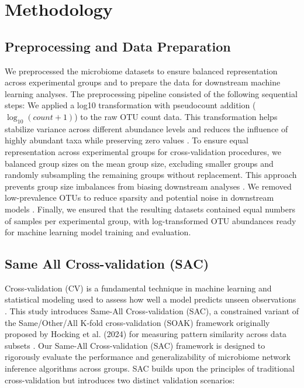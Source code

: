 \documentclass[]{Liebert_Author_revised}
\providecommand{\DIFadd}[1]{{\ifmmode\else\leavevmode\fi\color{blue}#1}} %
\providecommand{\DIFaddbegin}{} %
\providecommand{\DIFaddend}{} %
\begin{document}
\section{Methodology}
\subsection{Preprocessing and Data Preparation}
We preprocessed the microbiome datasets to ensure balanced representation across experimental groups and to prepare the data for downstream machine learning analyses.
The preprocessing pipeline consisted of the following sequential steps:
We applied a log10 transformation with pseudocount addition ($\log_{10}(count + 1)$) to the raw OTU count data.
This transformation helps stabilize variance across different abundance levels and reduces the influence of highly abundant taxa while preserving zero values \citep{agyapong2025cross, weiss2017normalization}.
To ensure equal representation across experimental groups for cross-validation procedures, we  \DIFaddbegin \DIFadd{balanced group sizes on }\DIFaddend the mean group size\DIFaddbegin \DIFadd{, excluding smaller groups }\DIFaddend and randomly subsampling  \DIFaddbegin \DIFadd{the remaining groups without replacement}\DIFaddend .
This approach prevents group size imbalances from biasing downstream analyses \citep{Knights2011supervised, pasolli2016machine}.
We removed low-prevalence OTUs to reduce sparsity and potential noise in downstream models \citep{papoutsoglou2023machine,Cao2021,Kurtz2015}.
Finally, we ensured that the resulting datasets contained equal numbers of samples per experimental group, with log-transformed OTU abundances ready for machine learning model training and evaluation.


\subsection{Same All Cross-validation (SAC)}
Cross-validation \DIFaddbegin \DIFadd{(CV) is a fundamental technique in machine learning and statistical modeling used to assess how well a model predicts unseen observations \citep{stone1974cv,agyapong2025cross}}\DIFaddend .
This study introduces Same-All Cross-validation (SAC), a constrained variant of the Same/Other/All K-fold cross-validation (SOAK) framework originally proposed by Hocking et al. (2024) for measuring pattern similarity across data subsets \citep{hocking2024soaksameotherallkfoldcrossvalidation}.
Our Same-All Cross-validation (SAC) framework is designed to rigorously evaluate the performance and generalizability of microbiome network inference algorithms across  \DIFaddbegin \DIFadd{groups}\DIFaddend .
SAC builds upon the principles of traditional cross-validation but introduces two distinct validation scenarios:
\end{document}
